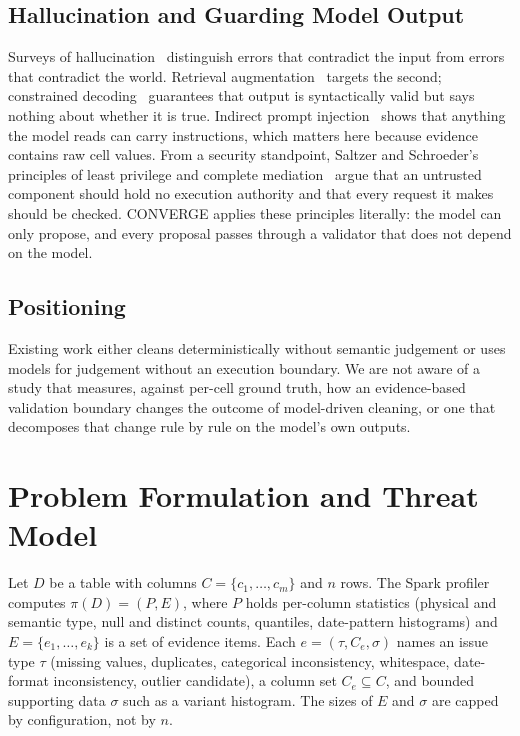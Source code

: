 \subsection{Hallucination and Guarding Model Output}
Surveys of hallucination~\cite{ji2023hallucination,huang2025hallucination} distinguish errors that contradict the input from errors that contradict the world. Retrieval augmentation~\cite{lewis2020rag} targets the second; constrained decoding~\cite{willard2023outlines} guarantees that output is syntactically valid but says nothing about whether it is true. Indirect prompt injection~\cite{greshake2023injection} shows that anything the model reads can carry instructions, which matters here because evidence contains raw cell values. From a security standpoint, Saltzer and Schroeder's principles of least privilege and complete mediation~\cite{saltzer1975protection} argue that an untrusted component should hold no execution authority and that every request it makes should be checked. CONVERGE applies these principles literally: the model can only propose, and every proposal passes through a validator that does not depend on the model.

\subsection{Positioning}
Existing work either cleans deterministically without semantic judgement or uses models for judgement without an execution boundary. We are not aware of a study that measures, against per-cell ground truth, how an evidence-based validation boundary changes the outcome of model-driven cleaning, or one that decomposes that change rule by rule on the model's own outputs.

\section{Problem Formulation and Threat Model}
\label{sec:problem}
Let $D$ be a table with columns $C=\{c_1,\dots,c_m\}$ and $n$ rows. The Spark profiler computes $\pi(D)=(P,E)$, where $P$ holds per-column statistics (physical and semantic type, null and distinct counts, quantiles, date-pattern histograms) and $E=\{e_1,\dots,e_k\}$ is a set of evidence items. Each $e=(\tau,C_e,\sigma)$ names an issue type $\tau$ (missing values, duplicates, categorical inconsistency, whitespace, date-format inconsistency, outlier candidate), a column set $C_e\subseteq C$, and bounded supporting data $\sigma$ such as a variant histogram. The sizes of $E$ and $\sigma$ are capped by configuration, not by $n$.

